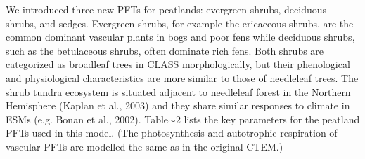 We introduced three new P\+F\+Ts for peatlands\+: evergreen shrubs, deciduous shrubs, and sedges. Evergreen shrubs, for example the ericaceous shrubs, are the common dominant vascular plants in bogs and poor fens while deciduous shrubs, such as the betulaceous shrubs, often dominate rich fens. Both shrubs are categorized as broadleaf trees in C\+L\+A\+S\+S morphologically, but their phenological and physiological characteristics are more similar to those of needleleaf trees. The shrub tundra ecosystem is situated adjacent to needleleaf forest in the Northern Hemisphere (Kaplan et al., 2003) and they share similar responses to climate in E\+S\+Ms (e.\+g. Bonan et al., 2002). Table$\sim$2 lists the key parameters for the peatland P\+F\+Ts used in this model. (The photosynthesis and autotrophic respiration of vascular P\+F\+Ts are modelled the same as in the original C\+T\+E\+M.) 
